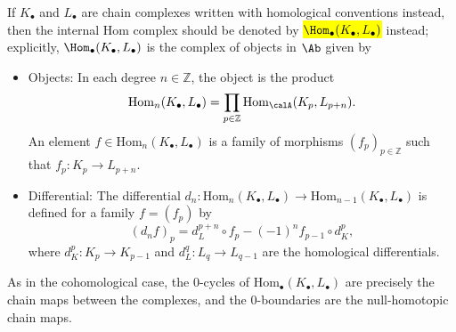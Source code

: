 \begin{definition}
    If $K_\bullet$ and $L_\bullet$ are chain complexes written with homological conventions instead, then the internal Hom complex should be denoted by \hl{$\Hom_\bullet(K_\bullet, L_\bullet)$} instead; explicitly, $\Hom_\bullet(K_\bullet, L_\bullet)$ is the complex of objects in $\Ab$ given by 
    \begin{itemize}
        \item Objects: In each degree $n \in \mathbb{Z}$, the object is the product
        $$ \mathrm{Hom}_n(K_\bullet, L_\bullet) = \prod_{p \in \mathbb{Z}} \mathrm{Hom}_{\calA}(K_p, L_{p+n}). $$
        An element $f \in \mathrm{Hom}_n(K_\bullet, L_\bullet)$ is a family of morphisms $(f_p)_{p \in \mathbb{Z}}$ such that $f_p: K_p \to L_{p+n}$.
        \item Differential: The differential $d_n: \mathrm{Hom}_n(K_\bullet, L_\bullet) \to \mathrm{Hom}_{n-1}(K_\bullet, L_\bullet)$ is defined for a family $f = (f_p)$ by
        $$ (d_n f)_p = d_L^{p+n} \circ f_p - (-1)^n f_{p-1} \circ d_K^p, $$
        where $d_K^p: K_p \to K_{p-1}$ and $d_L^q: L_q \to L_{q-1}$ are the homological differentials.
    \end{itemize}

    As in the cohomological case, the $0$-cycles of $\mathrm{Hom}_\bullet(K_\bullet, L_\bullet)$ are precisely the chain maps between the complexes, and the $0$-boundaries are the null-homotopic chain maps.

\end{definition}